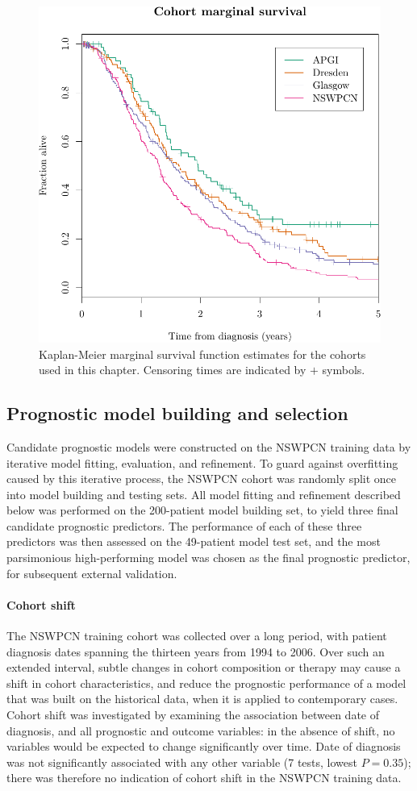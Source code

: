 \documentclass[dissertation.tex]{subfiles}
\begin{document}
\begin{figure}
\centering
  \includegraphics[width=.7\textwidth]{analysis/nomogram/figure/07-cohort-surv-comparison-1}
\caption[Cohort marginal survival estimates]{Kaplan-Meier marginal survival function estimates for the cohorts used in this chapter.  Censoring times are indicated by $+$ symbols.}
\label{fig:nomo-cohort-km}
\end{figure}

\subsection{Prognostic model building and selection}
Candidate prognostic models were constructed on the \gls{NSWPCN} training data by iterative model fitting, evaluation, and refinement.  To guard against overfitting caused by this iterative process, the \gls{NSWPCN} cohort was randomly split once into model building and testing sets.  All model fitting and refinement described below was performed on the 200-patient model building set, to yield three final candidate prognostic predictors.  The performance of each of these three predictors was then assessed on the 49-patient model test set, and the most parsimonious high-performing model was chosen as the final prognostic predictor, for subsequent external validation.

\paragraph{Cohort shift}
The \gls{NSWPCN} training cohort was collected over a long period, with patient diagnosis dates spanning the thirteen years from 1994 to 2006.  Over such an extended interval, subtle changes in cohort composition or therapy may cause a shift in cohort characteristics, and reduce the prognostic performance of a model that was built on the historical data, when it is applied to contemporary cases.  Cohort shift was investigated by examining the association between date of diagnosis, and all prognostic and outcome variables: in the absence of shift, no variables would be expected to change significantly over time.  Date of diagnosis was not significantly associated with any other variable (7 tests, lowest $P = 0.35$); there was therefore no indication of cohort shift in the \gls{NSWPCN} training data.
\end{document}
